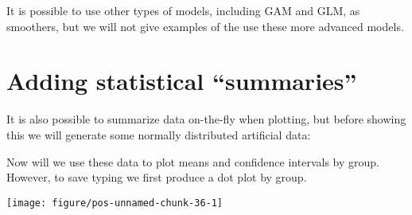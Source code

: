 \documentclass[paper=a4,10pt,div=17,headsepline,BCOR=12mm,twoside,open=right]{scrbook}\usepackage{knitr}
\begin{document}
It is possible to use other types of models, including GAM and GLM, as smoothers, but we will not give examples of the use these more advanced models.

\section{Adding statistical ``summaries''}

It is also possible to summarize data on-the-fly when plotting, but before showing this we will generate some normally distributed artificial data:

\begin{knitrout}\footnotesize
{}\color{fgcolor}\begin{kframe}
\begin{alltt}
 \hlkwb{<-} \hlstd{(}
   \hlstd{=} \hlstd{(}\hlstd{(}\hlstd{,} \hlstd{=}\hlstd{,} \hlstd{=}\hlstd{),}
        \hlstd{(}\hlstd{,} \hlstd{=}\hlstd{,} \hlstd{=}\hlstd{)),}
   \hlstd{=} \hlstd{(}\hlstd{(}\hlstd{(}\hlstd{,} \hlstd{),} \hlstd{(}\hlstd{,} \hlstd{)))}
  \hlstd{)}
\end{alltt}
\end{kframe}
\end{knitrout}

Now will we use these data to plot means and confidence intervals by group. However, to save typing we first produce a dot plot by group.

\begin{knitrout}\footnotesize
{}\color{fgcolor}\begin{kframe}
\begin{alltt}
 \hlkwb{<-} \hlstd{(} \hlstd{(}  \hlopt{+}
          \hlstd{()}
\end{alltt}
\end{kframe}

{\centering \texttt{[image: figure/pos-unnamed-chunk-36-1]} 

}



\end{knitrout}
\end{document}
